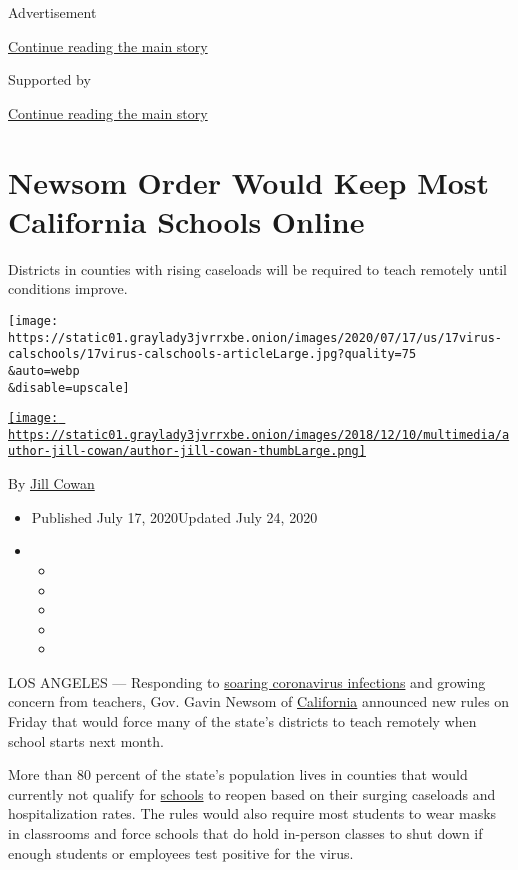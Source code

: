Advertisement

\protect\hyperlink{after-top}{Continue reading the main story}

Supported by

\protect\hyperlink{after-sponsor}{Continue reading the main story}

\hypertarget{newsom-order-would-keep-most-california-schools-online}{%
\section{Newsom Order Would Keep Most California Schools
Online}\label{newsom-order-would-keep-most-california-schools-online}}

Districts in counties with rising caseloads will be required to teach
remotely until conditions improve.

\texttt{[image: https://static01.graylady3jvrrxbe.onion/images/2020/07/17/us/17virus-calschools/17virus-calschools-articleLarge.jpg?quality=75\\\&auto=webp\\\&disable=upscale]}

\href{https://www.nytimes3xbfgragh.onion/by/jill-cowan}{\texttt{[image: https://static01.graylady3jvrrxbe.onion/images/2018/12/10/multimedia/author-jill-cowan/author-jill-cowan-thumbLarge.png]}}

By \href{https://www.nytimes3xbfgragh.onion/by/jill-cowan}{Jill Cowan}

\begin{itemize}
\item
  Published July 17, 2020Updated July 24, 2020
\item
  \begin{itemize}
  \item
  \item
  \item
  \item
  \item
  \end{itemize}
\end{itemize}

LOS ANGELES --- Responding to
\href{https://www.nytimes3xbfgragh.onion/interactive/2020/us/california-coronavirus-cases.html}{soaring
coronavirus infections} and growing concern from teachers, Gov. Gavin
Newsom of
\href{https://www.nytimes3xbfgragh.onion/2020/07/24/us/ca-schools-reopening.html}{California}
announced new rules on Friday that would force many of the state's
districts to teach remotely when school starts next month.

More than 80 percent of the state's population lives in counties that
would currently not qualify for
\href{https://www.nytimes3xbfgragh.onion/2020/07/24/us/ca-schools-reopening.html}{schools}
to reopen based on their surging caseloads and hospitalization rates.
The rules would also require most students to wear masks in classrooms
and force schools that do hold in-person classes to shut down if enough
students or employees test positive for the virus.

